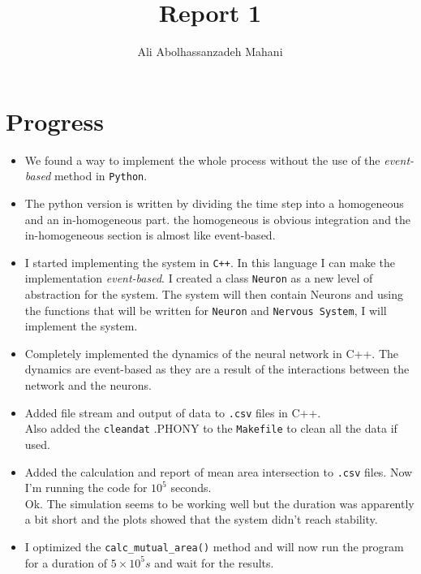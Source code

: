 \documentclass[a4paper, 12pt]{article}
\title{Report 1}
\author{Ali Abolhassanzadeh Mahani}
\begin{document}
	\section{Progress}
	\begin{itemize}
		\item We found a way to implement the whole process without the use of 
		the \textit{event-based} method in \texttt{Python}.
		
		\item The python version is written by dividing the time step into a homogeneous 
		and an in-homogeneous part. the homogeneous is obvious integration and 
		the in-homogeneous section is almost like event-based. 
		
		\item I started implementing the system in \texttt{C++}. In this language I can
		make the implementation \textit{event-based}. 
		I created a class \texttt{Neuron} as a new level of abstraction for the system.
		The system will then contain Neurons and using the functions that will be written
		for \texttt{Neuron} and \texttt{Nervous System}, I will implement the system.
		
		\item Completely implemented the dynamics of the neural network in C++.
		The dynamics are event-based as they are a result of the interactions between the
		network and the neurons.
		
		\item Added file stream and output of data to \texttt{.csv} files in C++.\\
		Also added the \texttt{cleandat} .PHONY to the \texttt{Makefile} to clean all the data if used.
		
		\item Added the calculation and report of mean area intersection to \texttt{.csv} files.
		Now I'm running the code for $10^5$ seconds. \\
		Ok. The simulation seems to be working well but the duration was apparently a bit short and 
		the plots showed that the system didn't reach stability.
		
		\item I optimized the \texttt{calc\_mutual\_area()} method and will now run the program for 
		a duration of $5 \times 10^5 s$ and wait for the results.
	\end{itemize}
\end{document}
